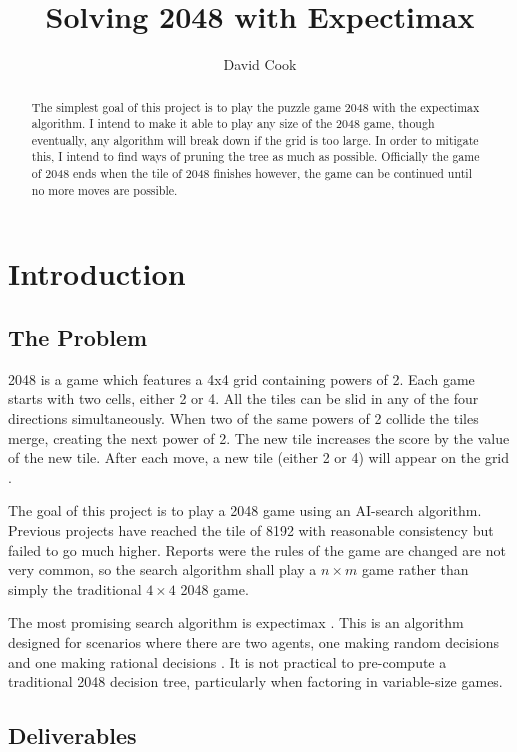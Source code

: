 \documentclass{article}
\title{Solving 2048 with Expectimax}
\author{David Cook}
\begin{document}
\maketitle

\tableofcontents
\newpage
\begin{abstract}
The simplest goal of this project is to play the puzzle game 2048 with the expectimax algorithm. I intend to make it able to play any size of the 2048 game, though eventually, any algorithm will break down if the grid is too large. In order to mitigate this, I intend to find ways of pruning the tree as much as possible. Officially the game of 2048 ends when the tile of 2048 finishes however, the game can be continued until no more moves are possible.
\end{abstract}
\section{Introduction}
\label{sec:intro}
\subsection{The Problem}
\label{subsec:problem}
2048 is a game which features a 4x4 grid containing powers of 2. Each game starts with two cells, either 2 or 4.
All the tiles can be slid in any of the four directions simultaneously. When two of the same powers of 2 collide the tiles merge, creating the next power of 2. The new tile increases the score by the value of the new tile. After each move, a new tile (either 2 or 4) will appear on the grid \cite{game2048}.

The goal of this project is to play a 2048 game using an AI-search algorithm. Previous projects have reached the tile of 8192 with reasonable consistency \cite{expectimax2048} but failed to go much higher. Reports were the rules of the game are changed are not very common, so the search algorithm shall play a $n \times m$ game rather than simply the traditional $4 \times 4$ 2048 game.

The most promising search algorithm is expectimax \cite{aiplays2048}. This is an algorithm designed for scenarios where there are two agents, one making random decisions and one making rational decisions \cite[~p.200]{russell2010artificial}. It is not practical to pre-compute a traditional 2048 decision tree, particularly when factoring in variable-size games.

\subsection{Deliverables}
\label{subsec:deliverable}
\end{document}
